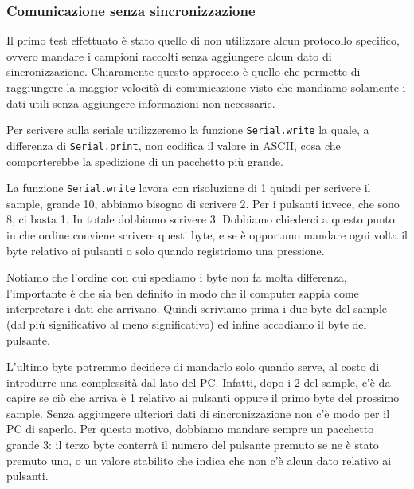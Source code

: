 \documentclass[a4paper,11pt]{article}
\begin{document}
\subsubsection{Comunicazione senza sincronizzazione}
Il primo test effettuato è stato quello di non utilizzare alcun protocollo specifico, ovvero mandare i campioni raccolti senza aggiungere alcun dato di sincronizzazione. Chiaramente questo approccio è quello che permette di raggiungere la maggior velocità di comunicazione visto che mandiamo solamente i dati utili senza aggiungere informazioni non necessarie.

Per scrivere sulla seriale utilizzeremo la funzione \texttt{Serial.write} la quale, a differenza di \texttt{Serial.print}, non codifica il valore in ASCII, cosa che comporterebbe la spedizione di un pacchetto più grande.

La funzione \texttt{Serial.write} lavora con risoluzione di \SI{1}{\byte} quindi per scrivere il sample, grande \SI{10}{\bit}, abbiamo bisogno di scrivere \SI{2}{\byte}. Per i pulsanti invece, che sono \num{8}, ci basta \SI{1}{\byte}. In totale dobbiamo scrivere \SI{3}{\byte}. Dobbiamo chiederci a questo punto in che ordine conviene scrivere questi byte, e se è opportuno mandare ogni volta il byte relativo ai pulsanti o solo quando registriamo una pressione.

Notiamo che l'ordine con cui spediamo i byte non fa molta differenza, l'importante è che sia ben definito in modo che il computer sappia come interpretare i dati che arrivano. Quindi scriviamo prima i due byte del sample (dal più significativo al meno significativo) ed infine accodiamo il byte del pulsante.

L'ultimo byte potremmo decidere di mandarlo solo quando serve, al costo di introdurre una complessità dal lato del PC. Infatti, dopo i \SI{2}{\byte} del sample, c'è da capire se ciò che arriva è \SI{1}{\byte} relativo ai pulsanti oppure il primo byte del prossimo sample. Senza aggiungere ulteriori dati di sincronizzazione non c'è modo per il PC di saperlo. Per questo motivo, dobbiamo mandare sempre un pacchetto grande \SI{3}{\byte}: il terzo byte conterrà il numero del pulsante premuto se ne è stato premuto uno, o un valore stabilito che indica che non c'è alcun dato relativo ai pulsanti.
\end{document}
